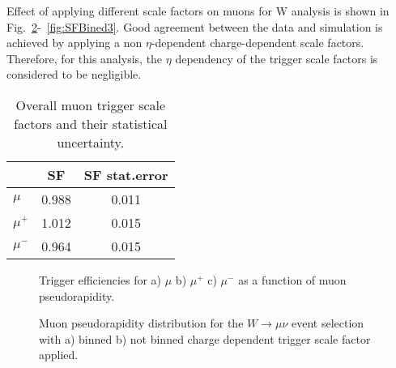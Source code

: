 Effect of applying different scale factors on muons for W analysis is shown in Fig.~\ref{fig:SFBined1}-~\ref{fig:SFBined3}. Good agreement between the data and simulation is achieved by applying a non $\eta$-dependent charge-dependent scale factors. Therefore, for this analysis, the $\eta$ dependency of the trigger scale factors is considered to be negligible.

\begin{table}[!t]
    \caption{Overall muon trigger scale factors and their statistical uncertainty.}
	\label{tab:MuonSF}
	\begin{center}
		\begin{tabular}{|l | c | c|}
		\hline
		& SF & SF stat.error\\
		\hline
		\hline
		$\mu$ & 0.988 & 0.011\\
		\hline
		$\mu^{+}$ & 1.012 & 0.015\\
		$\mu^{-}$ & 0.964 & 0.015\\
		\hline
		\end{tabular}
		\end{center}
\end{table}

\begin{figure}[!b]
\endminipage\hfill
{}
\endminipage\hfill
{}%
\endminipage
\caption{Trigger efficiencies for a) $\mu$ b) $\mu^{+}$  c) $\mu^{-}$ as a function of muon pseudorapidity.}
\label{fig:MuSF}
\end{figure}

\begin{figure}[!tbp]
\endminipage\hfill
{}
\endminipage\hfill
\caption{Muon pseudorapidity distribution for the $W\to \mu \nu$  event selection with a) binned  b) not binned charge dependent trigger scale factor applied.}
\label{fig:SFBined1}
\end{figure}

